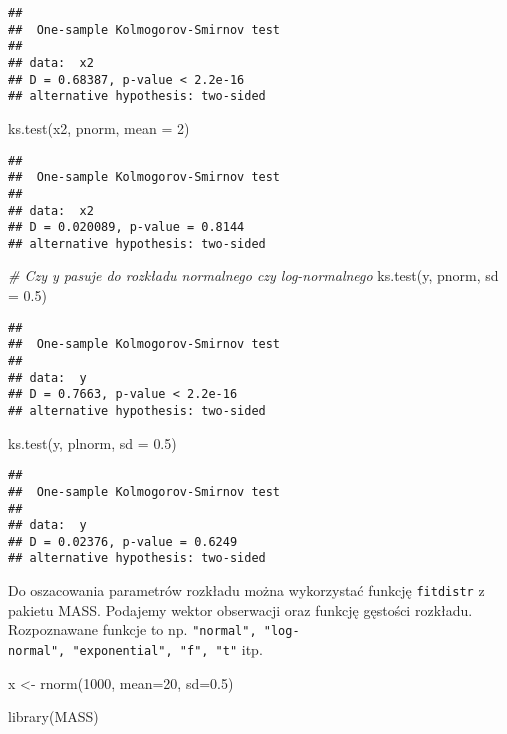 \documentclass[
]{book}
\newenvironment{Shaded}{\begin{snugshade}}{\end{snugshade}}
\newcommand{\AttributeTok}[1]{\textcolor[rgb]{0.77,0.63,0.00}{#1}}
\newcommand{\CommentTok}[1]{\textcolor[rgb]{0.56,0.35,0.01}{\textit{#1}}}
\newcommand{\DecValTok}[1]{\textcolor[rgb]{0.00,0.00,0.81}{#1}}
\newcommand{\FloatTok}[1]{\textcolor[rgb]{0.00,0.00,0.81}{#1}}
\newcommand{\FunctionTok}[1]{\textcolor[rgb]{0.00,0.00,0.00}{#1}}
\newcommand{\NormalTok}[1]{#1}
\newcommand{\OtherTok}[1]{\textcolor[rgb]{0.56,0.35,0.01}{#1}}
\begin{document}
\begin{verbatim}
## 
##  One-sample Kolmogorov-Smirnov test
## 
## data:  x2
## D = 0.68387, p-value < 2.2e-16
## alternative hypothesis: two-sided
\end{verbatim}

\begin{Shaded}
\begin{Highlighting}[]
\FunctionTok{ks.test}\NormalTok{(x2, pnorm, }\AttributeTok{mean =} \DecValTok{2}\NormalTok{)}
\end{Highlighting}
\end{Shaded}

\begin{verbatim}
## 
##  One-sample Kolmogorov-Smirnov test
## 
## data:  x2
## D = 0.020089, p-value = 0.8144
## alternative hypothesis: two-sided
\end{verbatim}

\begin{Shaded}
\begin{Highlighting}[]
\CommentTok{\# Czy y pasuje do rozkładu normalnego czy log{-}normalnego}
\FunctionTok{ks.test}\NormalTok{(y, pnorm, }\AttributeTok{sd =} \FloatTok{0.5}\NormalTok{)}
\end{Highlighting}
\end{Shaded}

\begin{verbatim}
## 
##  One-sample Kolmogorov-Smirnov test
## 
## data:  y
## D = 0.7663, p-value < 2.2e-16
## alternative hypothesis: two-sided
\end{verbatim}

\begin{Shaded}
\begin{Highlighting}[]
\FunctionTok{ks.test}\NormalTok{(y, plnorm, }\AttributeTok{sd =} \FloatTok{0.5}\NormalTok{)}
\end{Highlighting}
\end{Shaded}

\begin{verbatim}
## 
##  One-sample Kolmogorov-Smirnov test
## 
## data:  y
## D = 0.02376, p-value = 0.6249
## alternative hypothesis: two-sided
\end{verbatim}

Do oszacowania parametrów rozkładu można wykorzystać funkcję \texttt{fitdistr} z pakietu MASS. Podajemy wektor obserwacji oraz funkcję gęstości rozkładu. Rozpoznawane funkcje to np. \texttt{"normal",\ "log-normal",\ "exponential",\ "f",\ "t"} itp.

\begin{Shaded}
\begin{Highlighting}[]
\NormalTok{x }\OtherTok{\textless{}{-}} \FunctionTok{rnorm}\NormalTok{(}\DecValTok{1000}\NormalTok{, }\AttributeTok{mean=}\DecValTok{20}\NormalTok{, }\AttributeTok{sd=}\FloatTok{0.5}\NormalTok{)}

\FunctionTok{library}\NormalTok{(MASS)}
\end{Highlighting}
\end{Shaded}
\end{document}
